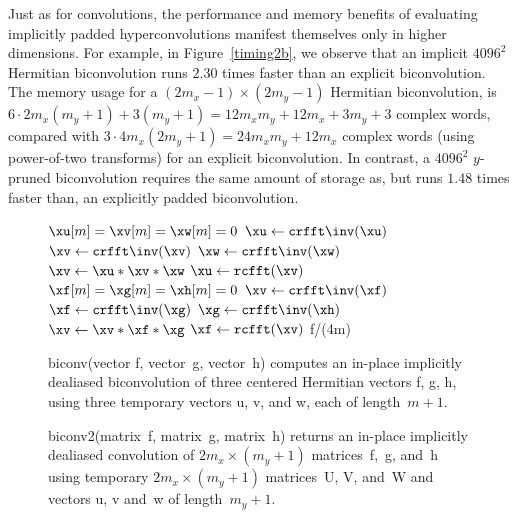 \documentclass[final]{siamltex}
\begin{document}
Just as for convolutions, the performance and memory benefits of
evaluating implicitly padded hyperconvolutions manifest themselves only in
higher dimensions. For example, in Figure~\ref{timing2b}, we observe 
that an implicit $4096^2$ Hermitian biconvolution runs $2.30$ times
faster than an explicit biconvolution.
The memory usage for a $(2m_x-1)\times (2m_y-1)$ Hermitian biconvolution,
is $6\cdot 2m_x(m_y+1)+3(m_y+1)=12m_xm_y+12m_x+3m_y+3$ complex words,
compared with $3\cdot 4m_x(2m_y+1)=24m_xm_y+12m_x$ complex words
(using power-of-two transforms) for an explicit biconvolution. In contrast, a
$4096^2$ $y$-pruned biconvolution requires the same amount of storage as, but
runs $1.48$ times faster than, an explicitly padded biconvolution.

\begin{figure}[htbp]
\begin{minipage}{0.445\linewidth}
\begin{function}[H]
  \medskip
  $\xu[m]=\xv[m]=\xw[m]=0$\;
  $\xu \leftarrow \crfft\inv(\xu)$\;
  $\xv \leftarrow \crfft\inv(\xv)$\;
  $\xw \leftarrow \crfft\inv(\xw)$\;
  $\xv \leftarrow \xu * \xv * \xw$\;
  $\xu \leftarrow \rcfft(\xv)$\;
  \medskip
  $\xf[m]=\xg[m]=\xh[m]=0$\;
  $\xv \leftarrow \crfft\inv(\xf)$\;
  $\xf \leftarrow \crfft\inv(\xg)$\;
  $\xg \leftarrow \crfft\inv(\xh)$\;
  $\xv \leftarrow \xv * \xf * \xg$\;
  $\xf \leftarrow \rcfft(\xv)$\;
  \medskip
  \Return f/(4m)\;
\caption{biconv(vector {\sf f}, vector~{\sf g}, vector~{\sf h}) computes
an in-place implicitly dealiased biconvolution of three centered
Hermitian vectors {\sf f}, {\sf g}, {\sf h}, using three temporary vectors
{\sf u}, {\sf v}, and {\sf w}, each of length~$m+1$.}\label{biconv}
\end{function}
\end{minipage}
%
\begin{minipage}{0.5\linewidth}
\begin{function}[H]
  \Return \xf\;
\caption{biconv2(matrix~{\sf f}, matrix~{\sf g}, matrix~{\sf h}) 
returns an in-place implicitly dealiased convolution of \hbox{$2m_x\times
(m_y+1)$} matrices~{\sf f},~{\sf g}, and~{\sf h} using
temporary \hbox{$2m_x\times (m_y+1)$} matrices~{\sf U}, {\sf V}, and~{\sf W} and
vectors {\sf u}, {\sf v} and~{\sf w} of length~$m_y+1$.
}\label{biconv2}
\end{function}
\end{minipage}
\end{figure}
\end{document}
